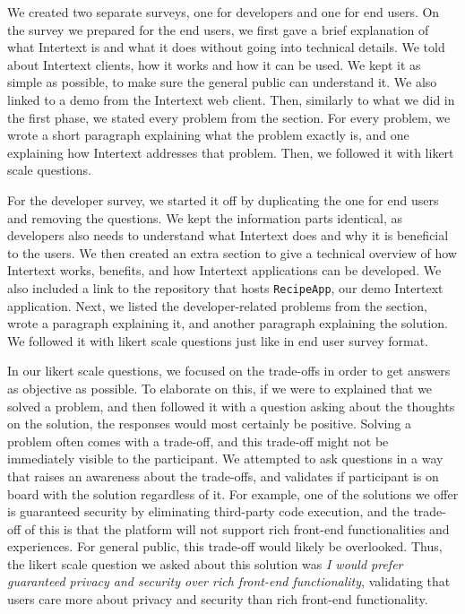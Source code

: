 We created two separate surveys, one for developers and one for end users. On the survey we prepared for the end users, we first gave a brief explanation of what Intertext is and what it does without going into technical details. We told about Intertext clients, how it works and how it can be used. We kept it as simple as possible, to make sure the general public can understand it. We also linked to a demo from the Intertext web client. Then, similarly to what we did in the first phase, we stated every problem from the  section. For every problem, we wrote a short paragraph explaining what the problem exactly is, and one explaining how Intertext addresses that problem. Then, we followed it with likert scale questions. 

For the developer survey, we started it off by duplicating the one for end users and removing the questions. We kept the information parts identical, as developers also needs to understand what Intertext does and why it is beneficial to the users. We then created an extra section to give a technical overview of how Intertext works, benefits, and how Intertext applications can be developed. We also included a link to the repository that hosts \texttt{RecipeApp}, our demo Intertext application. Next, we listed the developer-related problems from the  section, wrote a paragraph explaining it, and another paragraph explaining the solution. We followed it with likert scale questions just like in end user survey format.

In our likert scale questions, we focused on the trade-offs in order to get answers as objective as possible. To elaborate on this, if we were to explained that we solved a problem, and then followed it with a question asking about the thoughts on the solution, the responses would most certainly be positive. Solving a problem often comes with a trade-off, and this trade-off might not be immediately visible to the participant. We attempted to ask questions in a way that raises an awareness about the trade-offs, and validates if participant is on board with the solution regardless of it. For example, one of the solutions we offer is guaranteed security by eliminating third-party code execution, and the trade-off of this is that the platform will not support rich front-end functionalities and experiences. For general public, this trade-off would likely be overlooked. Thus, the likert scale question we asked about this solution was \textit{I would prefer guaranteed privacy and security over rich front-end functionality}, validating that users care more about privacy and security than rich front-end functionality.

